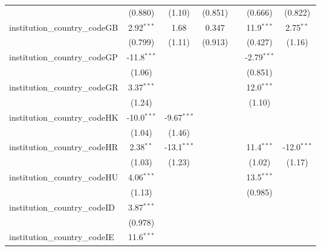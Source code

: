 \begin{tabular}{lcccccc}
                                         & (0.880)        & (1.10)        & (0.851)       &            & (0.666)       & (0.822)\\   
   institution\_country\_codeGB          & 2.92$^{***}$   & 1.68          & 0.347         &            & 11.9$^{***}$  & 2.75$^{**}$\\   
                                         & (0.799)        & (1.11)        & (0.913)       &            & (0.427)       & (1.16)\\   
   institution\_country\_codeGP          & -11.8$^{***}$  &               &               &            & -2.79$^{***}$ &   \\   
                                         & (1.06)         &               &               &            & (0.851)       &   \\   
   institution\_country\_codeGR          & 3.37$^{***}$   &               &               &            & 12.0$^{***}$  &   \\   
                                         & (1.24)         &               &               &            & (1.10)        &   \\   
   institution\_country\_codeHK          & -10.0$^{***}$  & -9.67$^{***}$ &               &            &               &   \\   
                                         & (1.04)         & (1.46)        &               &            &               &   \\   
   institution\_country\_codeHR          & 2.38$^{**}$    & -13.1$^{***}$ &               &            & 11.4$^{***}$  & -12.0$^{***}$\\   
                                         & (1.03)         & (1.23)        &               &            & (1.02)        & (1.17)\\   
   institution\_country\_codeHU          & 4.06$^{***}$   &               &               &            & 13.5$^{***}$  &   \\   
                                         & (1.13)         &               &               &            & (0.985)       &   \\   
   institution\_country\_codeID          & 3.87$^{***}$   &               &               &            &               &   \\   
                                         & (0.978)        &               &               &            &               &   \\   
   institution\_country\_codeIE          & 11.6$^{***}$   &               &               &            &               &   \\   

\end{tabular}
